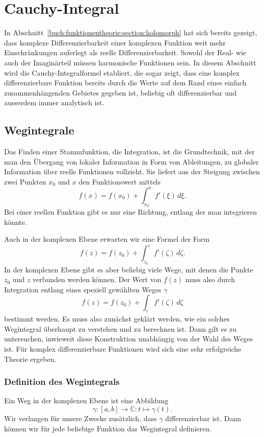 %
%
%
\section{Cauchy-Integral
\label{buch:funktionentheorie:section:cauchy}}
In Abschnitt~\ref{buch:funktionentheorie:section:holomorph} hat sich
bereits gezeigt, dass komplexe Differenzierbarkeit einer komplexen
Funktion weit mehr Einschränkungen auferlegt als reelle Differenzierbarkeit.
Sowohl der Real- wie auch der Imaginärteil müssen harmonische Funktionen
sein.
In diesem Abschnitt wird die Cauchy-In\-te\-gral\-formel etabliert, die 
sogar zeigt, dass eine komplex differenzierbare Funktion bereits durch 
die Werte auf dem Rand eines einfach zusammenhängenden Gebietes
gegeben ist, beliebig oft differenzierbar und ausserdem immer
analytisch ist.

%
%
\subsection{Wegintegrale\label{subsection:wegintegrale}}
Das Finden einer Stammfunktion, die Integration, ist die Grundtechnik,
%
mit der man den Übergang von lokaler Information in Form von Ableitungen,
zu globaler Information über reelle Funktionen vollzieht.
Sie liefert aus der Steigung zwischen zwei Punkten $x_0$ und $x$ den
Funktionswert mittels
\[
f(x)=f(x_0)+\int_{x_0}^xf'(\xi)\,d\xi.
\]
Bei einer reellen Funktion gibt es nur eine Richtung, entlang der man
integrieren könnte.

Auch in der komplexen Ebene erwarten wir eine Formel der Form
\[
f(z) = f(z_0) + \int_{z_0}^z f'(\zeta)\,d\zeta.
\]
In der komplexen Ebene gibt es aber beliebig viele Wege, mit denen die
Punkte $z_0$ und $z$ verbunden werden können.
Der Wert von $f(z)$ muss also durch Integration entlang eines speziell
gewählten Weges $\gamma$
\[
f(z) = f(z_0) + \int_{\gamma} f'(\zeta)\,d\zeta
\]
bestimmt werden.
Es muss also zunächst geklärt werden, wie ein solches Wegintegral
überhaupt zu verstehen und zu berechnen ist.
Dann gilt es zu untersuchen, inwieweit diese Konstruktion unabhängig
von der Wahl des Weges ist.
Für komplex differenzierbare Funktionen wird sich eine sehr erfolgreiche
Theorie ergeben.

%
%
\subsubsection{Definition des Wegintegrals}
Ein Weg in der komplexen Ebene ist eine Abbildung
%
\[
\gamma\colon [a,b]\to\mathbb C: t\mapsto \gamma(t).
\]
Wir verlangen für unsere Zwecke zusätzlich, dass $\gamma$ differenzierbar
ist.
Dann können wir für jede beliebige Funktion das Wegintegral definieren.


